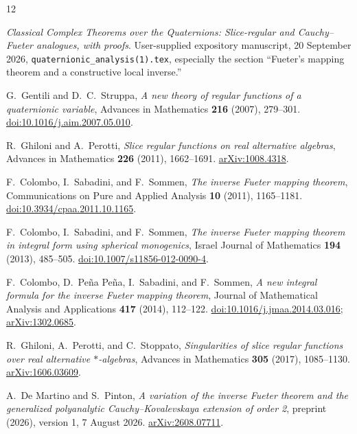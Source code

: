 \documentclass[11pt,a4paper]{article}
\numberwithin{equation}{section}
\theoremstyle{definition}
\theoremstyle{remark}
\begin{document}
\begin{thebibliography}{12}

\emph{Classical Complex Theorems over the Quaternions: Slice-regular and
Cauchy--Fueter analogues, with proofs}.
User-supplied expository manuscript, 20 September 2026,
\texttt{quaternionic\_analysis(1).tex}, especially the section
``Fueter's mapping theorem and a constructive local inverse.''

G.~Gentili and D.~C.~Struppa,
\emph{A new theory of regular functions of a quaternionic variable},
Advances in Mathematics \textbf{216} (2007), 279--301.
\href{https://doi.org/10.1016/j.aim.2007.05.010}{doi:10.1016/j.aim.2007.05.010}.

R.~Ghiloni and A.~Perotti,
\emph{Slice regular functions on real alternative algebras},
Advances in Mathematics \textbf{226} (2011), 1662--1691.
\href{https://arxiv.org/abs/1008.4318}{arXiv:1008.4318}.

F.~Colombo, I.~Sabadini, and F.~Sommen,
\emph{The inverse Fueter mapping theorem},
Communications on Pure and Applied Analysis \textbf{10} (2011), 1165--1181.
\href{https://doi.org/10.3934/cpaa.2011.10.1165}{doi:10.3934/cpaa.2011.10.1165}.

F.~Colombo, I.~Sabadini, and F.~Sommen,
\emph{The inverse Fueter mapping theorem in integral form using spherical
monogenics}, Israel Journal of Mathematics \textbf{194} (2013), 485--505.
\href{https://doi.org/10.1007/s11856-012-0090-4}{doi:10.1007/s11856-012-0090-4}.

F.~Colombo, D.~Pe\~na Pe\~na, I.~Sabadini, and F.~Sommen,
\emph{A new integral formula for the inverse Fueter mapping theorem},
Journal of Mathematical Analysis and Applications \textbf{417} (2014),
112--122.
\href{https://doi.org/10.1016/j.jmaa.2014.03.016}{doi:10.1016/j.jmaa.2014.03.016};
\href{https://arxiv.org/abs/1302.0685}{arXiv:1302.0685}.

R.~Ghiloni, A.~Perotti, and C.~Stoppato,
\emph{Singularities of slice regular functions over real alternative
$*$-algebras}, Advances in Mathematics \textbf{305} (2017), 1085--1130.
\href{https://arxiv.org/abs/1606.03609}{arXiv:1606.03609}.

A.~De Martino and S.~Pinton,
\emph{A variation of the inverse Fueter theorem and the generalized
polyanalytic Cauchy--Kovalevskaya extension of order 2},
preprint (2026), version 1, 7 August 2026.
\href{https://arxiv.org/abs/2608.07711}{arXiv:2608.07711}.

\end{thebibliography}
\end{document}
